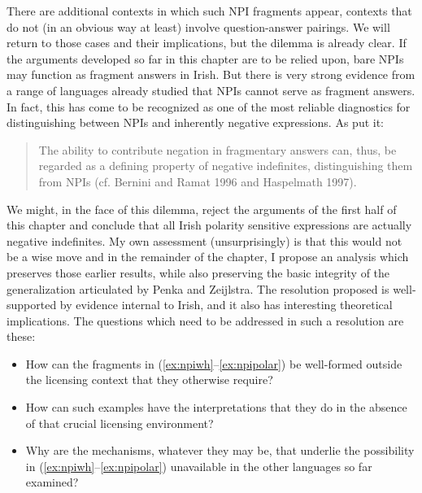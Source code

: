 \documentclass[output=paper,colorlinks,citecolor=brown]{langscibook}
\begin{document}
There are additional contexts in which such NPI fragments  appear, contexts that do not (in an obvious way at least) involve question-answer pairings. We will return to those cases and their implications, but the dilemma is already clear. If the arguments developed so far in this chapter are to be relied upon, bare NPIs may function as fragment answers in Irish.  But there is very strong evidence from a range of languages already studied that NPIs cannot serve as fragment answers. In fact, this has come to be recognized as one of the most reliable diagnostics for distinguishing between NPIs and inherently negative expressions. As \citet[778]{penka-zeijlstra:10} put it:

\begin{quote}
The ability to contribute negation in fragmentary answers can, thus, be regarded as a defining property of negative indefinites, distinguishing them from NPIs (cf. Bernini and Ramat 1996 and Haspelmath 1997).\nocite{bernini-ramat:96}
\end{quote}

\noindent We might, in the face of this dilemma, reject the arguments of the first half of this chapter and conclude that all Irish polarity sensitive expressions are actually negative indefinites. My own assessment (unsurprisingly) is that this would not be a wise move and in the remainder of the chapter, I propose an analysis which preserves those earlier results, while also preserving the basic integrity of the generalization articulated by Penka and Zeijlstra. The resolution proposed is well-supported by evidence internal to Irish, and it also has interesting theoretical implications.  The questions which need to be addressed in such a resolution are these:


\begin{itemize}
\item How can the fragments in (\ref{ex:npiwh}--\ref{ex:npipolar}) be well-formed outside the licensing context that they otherwise require?
\item How can such examples have the interpretations that they do in the absence of that crucial licensing environment?
\item Why are the mechanisms, whatever they may be, that underlie the possibility in (\ref{ex:npiwh}--\ref{ex:npipolar}) unavailable in the other languages so far examined?
\end{itemize}
\end{document}
